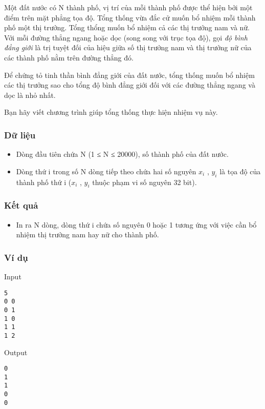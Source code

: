 

Một đất nước có N thành phố, vị trí của mỗi thành phố được thể hiện bởi một điểm trên mặt phẳng tọa độ. Tổng thống vừa đắc cử muốn bổ nhiệm mỗi thành phố một thị trưởng. Tổng thổng muốn bổ nhiệm cả các thị trưởng nam và nữ. Với mỗi đường thẳng ngang hoặc dọc (song song với trục tọa độ), gọi \emph{ độ bình đẳng giới } là trị tuyệt đối của hiệu giữa số thị trưởng nam và thị trưởng nữ của các thành phố nằm trên đường thẳng đó.

Để chứng tỏ tinh thần bình đẳng giới của đất nước, tổng thống muốn bổ nhiệm các thị trưởng sao cho tổng độ bình đẳng giới đối với các đường thẳng ngang và dọc là nhỏ nhất.

Bạn hãy viết chương trình giúp tổng thống thực hiện nhiệm vụ này.

\subsubsection{Dữ liệu}
\begin{itemize}
	\item Dòng đầu tiên chứa N (1 ≤ N ≤ 20000), số thành phố của đất nước.
	\item Dòng thứ i trong số N dòng tiếp theo chứa hai số nguyên $x_{i}$ , $y_{i}$ là tọa độ của thành phố thứ i ($x_{i}$ , $y_{i}$ thuộc phạm vi số nguyên 32 bit).
\end{itemize}

\subsubsection{Kết quả}
\begin{itemize}
	\item In ra N dòng, dòng thứ i chứa số nguyên 0 hoặc 1 tương ứng với việc cần bổ nhiệm thị trưởng nam hay nữ cho thành phố.
\end{itemize}

\subsubsection{Ví dụ}

Input
\begin{verbatim}
5
0 0
0 1
1 0
1 1
1 2\end{verbatim}

Output
\begin{verbatim}
0
1
1
0
0\end{verbatim}
